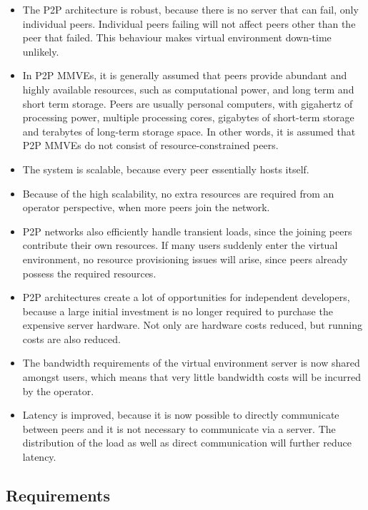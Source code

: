 \begin{itemize}
\item The P2P architecture is robust, because there is no server that can fail, only individual peers. Individual peers failing will not affect peers other than the peer that failed. This behaviour makes virtual environment down-time unlikely.

\item In P2P MMVEs, it is generally assumed that peers provide abundant and highly available resources, such as computational power, and long term and short term storage. Peers are usually personal computers, with gigahertz of processing power, multiple processing cores, gigabytes of short-term storage and terabytes of long-term storage space. In other words, it is assumed that P2P MMVEs do not consist of resource-constrained peers.

\item The system is scalable, because every peer essentially hosts itself.

\item Because of the high scalability, no extra resources are required from an operator perspective, when more peers join the network.

\item P2P networks also efficiently handle transient loads, since the joining peers contribute their own resources. If many users suddenly enter the virtual environment, no resource provisioning issues will arise, since peers already possess the required resources.

\item P2P architectures create a lot of opportunities for independent developers, because a large initial investment is no longer required to purchase
the expensive server hardware. Not only are hardware costs reduced, but running costs are also reduced.

\item The bandwidth requirements of the virtual environment server is now shared amongst users, which means that very little bandwidth costs will be incurred by the operator.

\item Latency is improved, because it is now possible to directly communicate between peers and it is not necessary to communicate via a server. The distribution of the load as well as direct communication will further reduce latency.
\end{itemize}

\subsection{Requirements}

